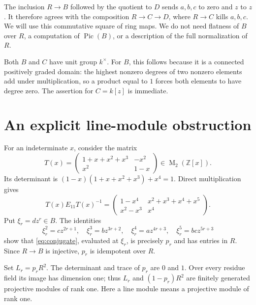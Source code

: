\documentclass[11pt]{article}
\theoremstyle{remark}
\DeclareMathOperator{\Mat}{M}
\DeclareMathOperator{\Pic}{Pic}
\begin{document}
The inclusion $R\to B$ followed by the quotient to $D$ sends $a,b,c$ to zero and $z$ to $z$. It therefore agrees with the composition $R\to C\to D$, where $R\to C$ kills $a,b,c$. We will use this commutative square of ring maps. We do not need flatness of $B$ over $R$, a computation of $\Pic(B)$, or a description of the full normalization of $R$.

Both $B$ and $C$ have unit group $k^\times$. For $B$, this follows because it is a connected positively graded domain: the highest nonzero degrees of two nonzero elements add under multiplication, so a product equal to $1$ forces both elements to have degree zero. The assertion for $C=k[z]$ is immediate.

\section{An explicit line-module obstruction}

For an indeterminate $x$, consider the matrix
\begin{equation}\label{eq:T}
 T(x)=\begin{pmatrix}
 1+x+x^2+x^3&-x^2\\
 x^2&1-x
 \end{pmatrix}\in\Mat_2(\mathbb Z[x]).
\end{equation}
Its determinant is $(1-x)(1+x+x^2+x^3)+x^4=1$. Direct multiplication gives
\begin{equation}\label{eq:conjugate}
 T(x)E_{11}T(x)^{-1}
 =\begin{pmatrix}1-x^4&x^2+x^3+x^4+x^5\\x^2-x^3&x^4\end{pmatrix}.
\end{equation}
Put $\xi_r=dz^r\in B$. The identities
\[
 \xi_r^2=cz^{2r+1},\quad \xi_r^3=bz^{3r+2},\quad
 \xi_r^4=az^{4r+3},\quad \xi_r^5=bcz^{5r+3}
\]
show that \eqref{eq:conjugate}, evaluated at $\xi_r$, is precisely $p_r$ and has entries in $R$. Since $R\to B$ is injective, $p_r$ is idempotent over $R$.

Set $L_r=p_rR^2$. The determinant and trace of $p_r$ are $0$ and $1$. Over every residue field its image has dimension one; thus $L_r$ and $(1-p_r)R^2$ are finitely generated projective modules of rank one. Here a line module means a projective module of rank one.
\end{document}
